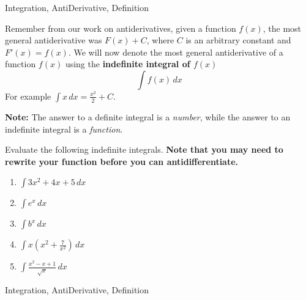 \begin{tagblock}{Integration, AntiDerivative, Definition }
\begin{question}

Remember from our work on antiderivatives, given a function $f(x)$, the most general antiderivative was $F(x) + C$, where $C$ is an arbitrary constant and $F'(x) = f(x)$.  We will now denote the most general antiderivative of a function $f(x)$ using the \textbf{indefinite integral of $f(x)$} 
\[ \int f(x) \, dx \]
For example $\displaystyle \int x \, dx = \frac{x^2}{2} + C .$

\textbf{Note:} The answer to a definite integral is a \emph{number}, while the answer to an indefinite integral is a \emph{function}.  

Evaluate the following indefinite integrals.  \textbf{Note that you may need to rewrite your function before you can antidifferentiate.  }
\begin{enumerate}  


\item $\displaystyle \int 3x^2 +4x +5 \, dx $

\vspace{.75in}

\item $\displaystyle \int e^x \, dx $

\vspace{.5in}

\item $\displaystyle \int b^x \, dx $

\vspace{.75in}


\item $\displaystyle \int x(x^2 + \frac{7}{x^2} ) \, dx $

\vspace{1in}


\item $\displaystyle \int \frac{x^2-x+1}{\sqrt{x}}\, dx $


\end{enumerate}





	
	
\begin{tags}
	  Integration, AntiDerivative, Definition
\end{tags}
	
\begin{diary}
	   
\end{diary}
	
\begin{solution}
	   
	    \end{enumerate}
\end{solution}
	
\end{question}

\end{tagblock}

